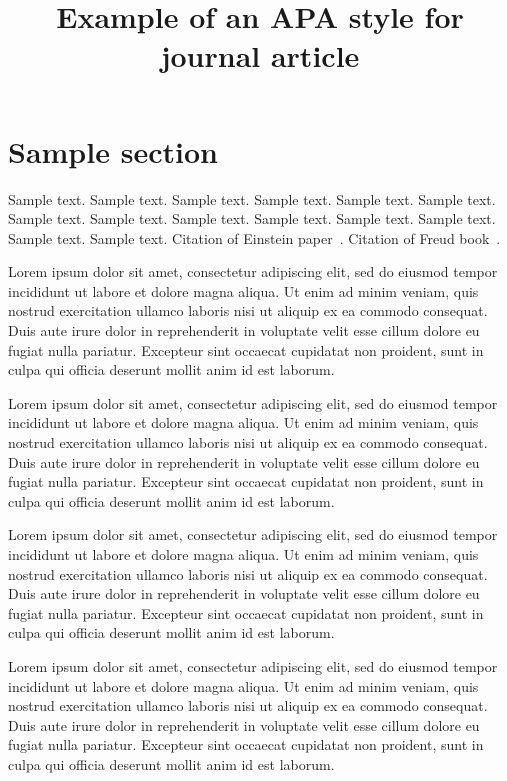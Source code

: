 \documentclass[jou,apacite]{apa6}
\title{Example of an APA style for journal article}
\begin{document}
  \maketitle    
                          
  \section{Sample section}
  Sample text. Sample text. Sample text. Sample text. Sample text. Sample text. 
  Sample text. Sample text. Sample text. Sample text. Sample text. Sample text. 
  Sample text. Sample text. Citation of Einstein paper~\cite{Einstein}. Citation of Freud book~\cite{Freud}.

  Lorem ipsum dolor sit amet, consectetur adipiscing elit, sed do eiusmod tempor incididunt ut labore et dolore magna aliqua. Ut enim ad minim veniam, quis nostrud exercitation ullamco laboris nisi ut aliquip ex ea commodo consequat. Duis aute irure dolor in reprehenderit in voluptate velit esse cillum dolore eu fugiat nulla pariatur. Excepteur sint occaecat cupidatat non proident, sunt in culpa qui officia deserunt mollit anim id est laborum.

  Lorem ipsum dolor sit amet, consectetur adipiscing elit, sed do eiusmod tempor incididunt ut labore et dolore magna aliqua. Ut enim ad minim veniam, quis nostrud exercitation ullamco laboris nisi ut aliquip ex ea commodo consequat. Duis aute irure dolor in reprehenderit in voluptate velit esse cillum dolore eu fugiat nulla pariatur. Excepteur sint occaecat cupidatat non proident, sunt in culpa qui officia deserunt mollit anim id est laborum.

  Lorem ipsum dolor sit amet, consectetur adipiscing elit, sed do eiusmod tempor incididunt ut labore et dolore magna aliqua. Ut enim ad minim veniam, quis nostrud exercitation ullamco laboris nisi ut aliquip ex ea commodo consequat. Duis aute irure dolor in reprehenderit in voluptate velit esse cillum dolore eu fugiat nulla pariatur. Excepteur sint occaecat cupidatat non proident, sunt in culpa qui officia deserunt mollit anim id est laborum.

  Lorem ipsum dolor sit amet, consectetur adipiscing elit, sed do eiusmod tempor incididunt ut labore et dolore magna aliqua. Ut enim ad minim veniam, quis nostrud exercitation ullamco laboris nisi ut aliquip ex ea commodo consequat. Duis aute irure dolor in reprehenderit in voluptate velit esse cillum dolore eu fugiat nulla pariatur. Excepteur sint occaecat cupidatat non proident, sunt in culpa qui officia deserunt mollit anim id est laborum.
\end{document}
